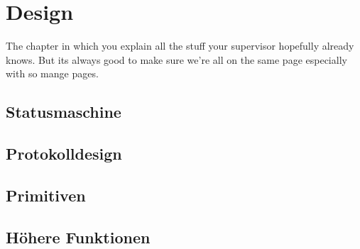 \documentclass[thesis.tex]{subfiles}
\begin{document}
\chapter{Design}\label{chap:design}
The chapter in which you explain all the stuff your supervisor hopefully already knows. But its always good to make sure we're all on the same page especially with so mange pages.

\section{Statusmaschine}
\section{Protokolldesign}
\section{Primitiven}
\section{Höhere Funktionen}


\subfilebib %
\end{document}
